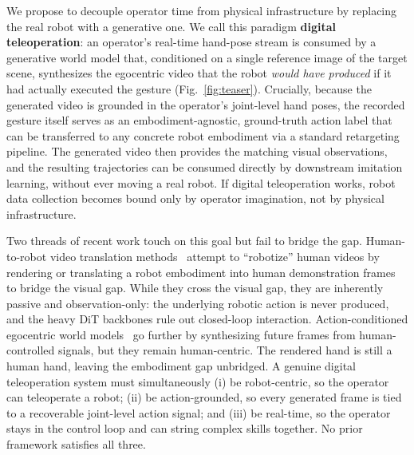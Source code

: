 We propose to decouple operator time from physical infrastructure by replacing the real robot with a generative one. We call this paradigm \textbf{digital teleoperation}: an operator's real-time hand-pose stream is consumed by a generative world model that, conditioned on a single reference image of the target scene, synthesizes the egocentric video that the robot \emph{would have produced} if it had actually executed the gesture (Fig.~\ref{fig:teaser}).
Crucially, because the generated video is grounded in the operator's joint-level hand poses, the recorded gesture itself serves as an embodiment-agnostic, ground-truth action label that can be transferred to any concrete robot embodiment via a standard retargeting pipeline. The generated video then provides the matching visual observations, and the resulting trajectories can be consumed directly by downstream imitation learning, without ever moving a real robot. If digital teleoperation works, robot data collection becomes bound only by operator imagination, not by physical infrastructure.



Two threads of recent work touch on this goal but fail to bridge the gap. Human-to-robot video translation methods~\citep{lepert2025masquerade, li2025h2r, lepert2503phantom, song2025mitty} attempt to ``robotize''  human videos by rendering or translating a robot embodiment into human demonstration frames to bridge the visual gap. While they cross the visual gap, they are inherently passive and observation-only: the underlying robotic action is never produced, and the heavy DiT backbones rule out closed-loop interaction. 
Action-conditioned egocentric world models~\citep{hao2026egosim,wang2026hand2world,wang2025precise,xie2026generated,tu2025playerone} go further by synthesizing future frames from human-controlled signals, but they remain human-centric. 
The rendered hand is still a human hand, leaving the embodiment gap unbridged.
A genuine digital teleoperation system must simultaneously (i) be robot-centric, so the operator can teleoperate a robot; (ii) be action-grounded, so every generated frame is tied to a recoverable joint-level action signal; and (iii) be real-time, so the operator stays in the control loop and can string complex skills together. No prior framework satisfies all three.



